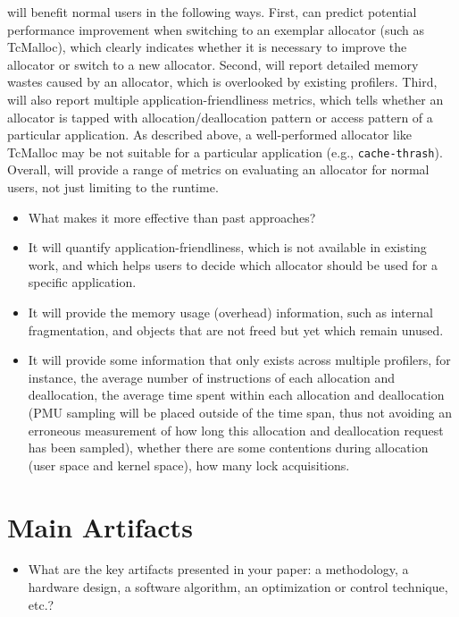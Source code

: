 \documentclass[pageno]{jpaper}
\begin{document}
\noindent
\MP{} will benefit normal users in the following ways. First, \MP{} can predict potential performance improvement when switching to an exemplar allocator (such as TcMalloc), which clearly indicates whether it is necessary to improve the allocator or switch to a new allocator. Second, \MP{} will report detailed memory wastes caused by an allocator, which is overlooked by existing profilers. Third, \MP{} will also report multiple application-friendliness metrics, which tells whether an allocator is tapped with allocation/deallocation pattern or access pattern of a particular application. As described above, a well-performed allocator like TcMalloc may be not suitable for a particular application (e.g., \texttt{cache-thrash}). Overall, \MP{} will provide a range of metrics on evaluating an allocator for normal users, not just limiting to the runtime. 

\begin{itemize}
\item What makes it more effective than past approaches?
\end{itemize}

\noindent
\begin{itemize}
\item It will quantify application-friendliness, which is not available in existing work, and which helps users to decide which allocator should be used for a specific application. 
\item It will provide the memory usage (overhead) information, such as internal fragmentation, and objects that are not freed but yet which remain unused. 
\item It will provide some information that only exists across multiple profilers, for instance, the average number of instructions of each allocation and deallocation, the average time spent within each allocation and deallocation (PMU sampling will be placed outside of the time span, thus not avoiding an erroneous measurement of how long this allocation and deallocation request has been sampled), whether there are some contentions during allocation (user space and kernel space), how many lock acquisitions.  
\end{itemize}

\section{Main Artifacts}
\label{sec:main-artifacts}

\begin{itemize}
\item What are the key artifacts presented in your paper: a
  methodology, a hardware design, a software algorithm, an
  optimization or control technique, etc.?
\end{itemize}
\end{document}
